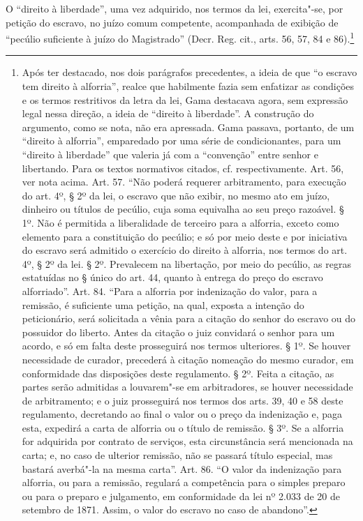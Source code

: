 O ``direito à liberdade'', uma vez adquirido, nos termos da lei,
exercita"-se, por petição do escravo, no juízo comum competente,
acompanhada de exibição de ``pecúlio suficiente à juízo do Magistrado''
(Decr. Reg. cit., arts. 56, 57, 84 e 86).\footnote{Após ter destacado,
  nos dois parágrafos precedentes, a ideia de que ``o escravo tem direito
  à alforria'', realce que habilmente fazia sem enfatizar as condições e
  os termos restritivos da letra da lei, Gama destacava agora, sem
  expressão legal nessa direção, a ideia de ``direito à liberdade''. A
  construção do argumento, como se nota, não era apressada. Gama
  passava, portanto, de um ``direito à alforria'', emparedado por uma série
  de condicionantes, para um ``direito à liberdade'' que valeria já com a
  ``convenção'' entre senhor e libertando. Para os textos normativos
  citados, cf. respectivamente. Art. 56, ver nota acima. Art. 57. ``Não
  poderá requerer arbitramento, para execução do art. 4º, § 2º da lei, o
  escravo que não exibir, no mesmo ato em juízo, dinheiro ou títulos de
  pecúlio, cuja soma equivalha ao seu preço razoável. § 1º. Não é
  permitida a liberalidade de terceiro para a alforria, exceto como
  elemento para a constituição do pecúlio; e só por meio deste e por
  iniciativa do escravo será admitido o exercício do direito à alforria,
  nos termos do art. 4º, § 2º da lei. § 2º. Prevalecem na libertação,
  por meio do pecúlio, as regras estatuídas no § único do art. 44,
  quanto à entrega do preço do escravo alforriado''. Art. 84. ``Para a
  alforria por indenização do valor, para a remissão, é suficiente uma
  petição, na qual, exposta a intenção do peticionário, será solicitada
  a vênia para a citação do senhor do escravo ou do possuidor do
  liberto. Antes da citação o juiz convidará o senhor para um acordo, e
  só em falta deste prosseguirá nos termos ulteriores. § 1º. Se houver
  necessidade de curador, precederá à citação nomeação do mesmo curador,
  em conformidade das disposições deste regulamento. § 2º. Feita a
  citação, as partes serão admitidas a louvarem"-se em arbitradores, se
  houver necessidade de arbitramento; e o juiz prosseguirá nos termos
  dos arts. 39, 40 e 58 deste regulamento, decretando ao final o valor
  ou o preço da indenização e, paga esta, expedirá a carta de alforria
  ou o título de remissão. § 3º. Se a alforria for adquirida por
  contrato de serviços, esta circunstância será mencionada na carta; e,
  no caso de ulterior remissão, não se passará título especial, mas
  bastará averbá"-la na mesma carta''. Art. 86. ``O valor da indenização para
  alforria, ou para a remissão, regulará a competência para o simples
  preparo ou para o preparo e julgamento, em conformidade da lei nº
  2.033 de 20 de setembro de 1871. Assim, o valor do escravo no caso de
  abandono''.}

